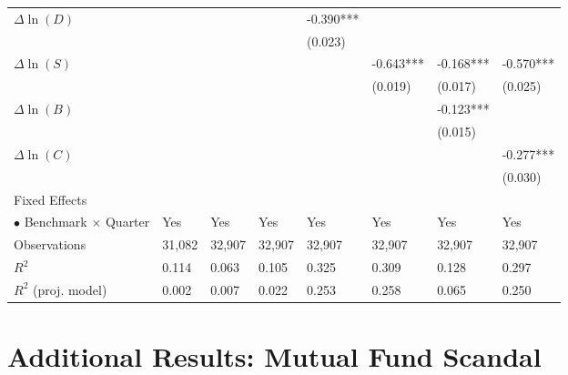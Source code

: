 \documentclass[openany]{book}
\theoremstyle{definition}
\theoremstyle{definition}
\theoremstyle{definition}
\theoremstyle{remark}
\begin{document}
\begin{table}[ht]
\begin{tabularx}{0.975\textwidth}{lYYYYYYY}
  $\Delta\ln(D)$ &  &  &  & -0.390*** &  &  &  \\ 
   &  &  &  & (0.023) &  &  &  \\ 
  $\Delta\ln(S)$ &  &  &  &  & -0.643*** & -0.168*** & -0.570*** \\ 
   &  &  &  &  & (0.019) & (0.017) & (0.025) \\ 
  $\Delta\ln(B)$ &  &  &  &  &  & -0.123*** &  \\ 
   &  &  &  &  &  & (0.015) &  \\ 
  $\Delta\ln(C)$ &  &  &  &  &  &  & -0.277*** \\ 
   &  &  &  &  &  &  & (0.030) \\ 
  Fixed Effects &  &  &  &  &  &  &  \\ 
  $\bullet$ Benchmark $\times$ Quarter & Yes & Yes & Yes & Yes & Yes & Yes & Yes \\ 
  Observations & 31,082 & 32,907 & 32,907 & 32,907 & 32,907 & 32,907 & 32,907 \\ 
  $R^2$ & 0.114 & 0.063 & 0.105 & 0.325 & 0.309 & 0.128 & 0.297 \\ 
  $R^2$ (proj. model) & 0.002 & 0.007 & 0.022 & 0.253 & 0.258 & 0.065 & 0.250 \\ 
   \bottomrule
\end{tabularx}
\endgroup
\end{table}

\hypertarget{additional-results-mutual-fund-scandal}{%
\chapter{Additional Results: Mutual Fund
Scandal}\label{additional-results-mutual-fund-scandal}}
\end{document}
